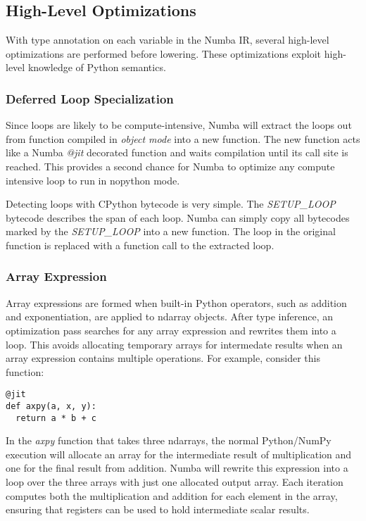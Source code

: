 \documentclass{acm_proc_article-sp}
\begin{document}
\subsection{High-Level Optimizations}

With type annotation on each variable in the Numba IR, several high-level
optimizations are performed before lowering. These optimizations exploit
high-level knowledge of Python semantics.

\subsubsection{Deferred Loop Specialization}

Since loops are likely to be compute-intensive, Numba will extract the
loops out from function compiled in \textit{object mode} into a new
function.  The new function acts like a Numba \textit{@jit} decorated
function and waits compilation until its call site is reached. This
provides a second chance for Numba to optimize any compute intensive
loop to run in nopython mode.

Detecting loops with CPython bytecode is very simple. The
\textit{SETUP\_LOOP} bytecode describes the span of each loop. Numba
can simply copy all bytecodes marked by the \textit{SETUP\_LOOP} into
a new function. The loop in the original function is replaced with a
function call to the extracted loop.

\subsubsection{Array Expression}

Array expressions are formed when built-in Python operators, such as
addition and exponentiation, are applied to ndarray objects. After
type inference, an optimization pass searches for any array expression
and rewrites them into a loop. This avoids allocating temporary arrays
for intermedate results when an array expression contains multiple
operations.  For example, consider this function:

\begin{lstlisting}
@jit
def axpy(a, x, y):
  return a * b + c
\end{lstlisting}

In the \textit{axpy} function that takes three ndarrays, the normal
Python/NumPy execution will allocate an array for the intermediate
result of multiplication and one for the final result from
addition. Numba will rewrite this expression into a loop over the
three arrays with just one allocated output array.  Each iteration
computes both the multiplication and addition for each element in the
array, ensuring that registers can be used to hold intermediate scalar
results.
\end{document}
